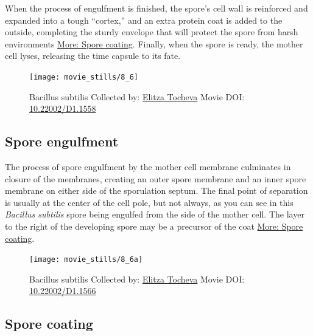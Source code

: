 \documentclass[]{tufte-book}
\begin{document}
When the process of engulfment is finished, the spore's cell wall is
reinforced and expanded into a tough ``cortex,'' and an extra protein
coat is added to the outside, completing the sturdy envelope that will
protect the spore from harsh environments
\protect\hyperlink{Spore_coating}{More: Spore coating}. Finally, when
the spore is ready, the mother cell lyses, releasing the time capsule to
its fate.





\begin{figure}
\texttt{[image: movie\_stills/8\_6]} \caption[Bacillus subtilis Collected by:
\protect\hyperlink{elitza_tocheva}{Elitza Tocheva} Movie DOI:
\href{https://doi.org/10.22002/D1.1558}{10.22002/D1.1558}]{Bacillus subtilis Collected by:
\protect\hyperlink{elitza_tocheva}{Elitza Tocheva} Movie DOI:
\href{https://doi.org/10.22002/D1.1558}{10.22002/D1.1558}}\label{fig:8-6}
\end{figure}

\hypertarget{Spore_engulfment}{\subsection{Spore
engulfment}\label{Spore_engulfment}}

The process of spore engulfment by the mother cell membrane culminates
in closure of the membranes, creating an outer spore membrane and an
inner spore membrane on either side of the sporulation septum. The final
point of separation is usually at the center of the cell pole, but not
always, as you can see in this \emph{Bacillus subtilis} spore being
engulfed from the side of the mother cell. The layer to the right of the
developing spore may be a precursor of the coat
\protect\hyperlink{Spore_coating}{More: Spore coating}.





\begin{figure}
\texttt{[image: movie\_stills/8\_6a]} \caption[Bacillus subtilis Collected by:
\protect\hyperlink{elitza_tocheva}{Elitza Tocheva} Movie DOI:
\href{https://doi.org/10.22002/D1.1566}{10.22002/D1.1566}]{Bacillus subtilis Collected by:
\protect\hyperlink{elitza_tocheva}{Elitza Tocheva} Movie DOI:
\href{https://doi.org/10.22002/D1.1566}{10.22002/D1.1566}}\label{fig:8-6a}
\end{figure}

\hypertarget{Spore_coating}{\subsection{Spore
coating}\label{Spore_coating}}
\end{document}
